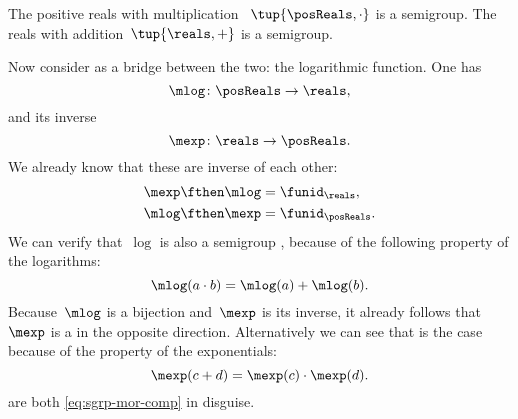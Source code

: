 \begin{example}
    The positive reals with multiplication ~$\tup{\posReals, \cdot}$ is a semigroup.
    The reals with addition~$\tup{\reals, +}$ is a semigroup.

    Now consider as a bridge between the two: the logarithmic function.
    One has
    \begin{equation*}
        \label{eq:log}
        \mlog \colon  \posReals \to \reals,
    \end{equation*}
    and its inverse
    \begin{equation*}
        \label{eq:exp}
        \mexp \colon  \reals \to \posReals.
    \end{equation*}
    We already know that these are inverse of each other:
    \begin{equation*}
        \label{eq:exp-log-are-inverses}
        \begin{aligned}
            \mexp \fthen \mlog & = \funid_{\reals},    \\
            \mlog \fthen \mexp & = \funid_{\posReals}.
        \end{aligned}
    \end{equation*}
    We can verify that~$\log$ is also a semigroup \whomo, because of the following property of the logarithms:
    \begin{equation}
        \label{eq:log-property}
        \mlog(a \cdot b) = \mlog(a) + \mlog(b).
    \end{equation}
    Because~$\mlog$ is a bijection and~$\mexp$ is its inverse, it already follows that~$\mexp$ is a \whomo in the opposite direction.
    Alternatively we can see that is the case because of the property of the exponentials:
    \begin{equation}
        \label{eq:exp-property}
        \mexp(c + d) = \mexp(c) \cdot \mexp(d).
    \end{equation}
     are both \cref{eq:sgrp-mor-comp} in disguise.
\end{example}

